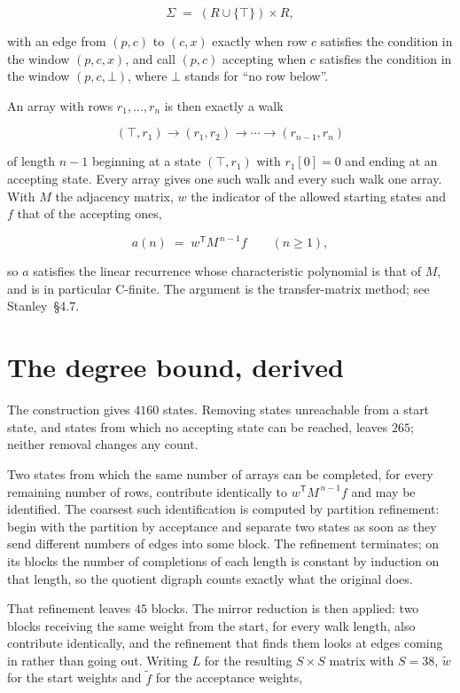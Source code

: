 \documentclass[11pt]{article}
\theoremstyle{definition}
\begin{document}
\[\Sigma \;=\; (R \cup \{\top\}) \times R,\]

with an edge from $(p,c)$ to $(c,x)$ exactly when row $c$ satisfies the condition in the window $(p,c,x)$, and call $(p,c)$ accepting when $c$ satisfies the condition in the window $(p,c,\bot)$, where $\bot$ stands for ``no row below''.

An array with rows $r_1,\dots,r_n$ is then exactly a walk

\[(\top,r_1) \to (r_1,r_2) \to \cdots \to (r_{n-1},r_n)\]

of length $n-1$ beginning at a state $(\top,r_1)$ with $r_1[0]=0$ and ending at an accepting state. Every array gives one such walk and every such walk one array. With $M$ the adjacency matrix, $w$ the indicator of the allowed starting states and $f$ that of the accepting ones,

\[a(n) \;=\; w^{\mathsf T} M^{\,n-1} f \qquad (n \ge 1),\]

so $a$ satisfies the linear recurrence whose characteristic polynomial is that of $M$, and is in particular C-finite. The argument is the transfer-matrix method; see Stanley~\S4.7.

\section{The degree bound, derived}

The construction gives $4160$ states. Removing states unreachable from a start state, and states from which no accepting state can be reached, leaves $265$; neither removal changes any count.

Two states from which the same number of arrays can be completed, for every remaining number of rows, contribute identically to $w^{\mathsf T}M^{\,n-1}f$ and may be identified. The coarsest such identification is computed by partition refinement: begin with the partition by acceptance and separate two states as soon as they send different numbers of edges into some block. The refinement terminates; on its blocks the number of completions of each length is constant by induction on that length, so the quotient digraph counts exactly what the original does.

That refinement leaves $45$ blocks. The mirror reduction is then applied: two blocks receiving the same weight from the start, for every walk length, also contribute identically, and the refinement that finds them looks at edges coming in rather than going out. Writing $L$ for the resulting $S \times S$ matrix with $S = 38$, $\tilde w$ for the start weights and $\tilde f$ for the acceptance weights,
\end{document}
